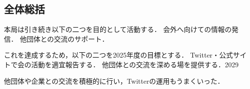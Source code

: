 \subsection*{全体総括}


本局は引き続き以下の二つを目的として活動する．
    会外へ向けての情報の発信．
    他団体との交流のサポート．
 
これを達成するため，以下の二つを2025年度の目標とする．
    Twitter・公式サイトで会の活動を適宜報告する．
    他団体との交流を深める場を提供する．2029

他団体や企業との交流を積極的に行い，Twitterの運用もうまくいった．
